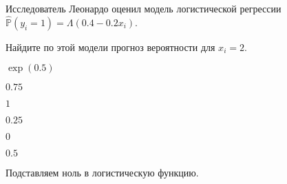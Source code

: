 
\begin{question}
Исследователь Леонардо оценил модель логистической регрессии
\(\hat{\mathbb{P}}(y_i = 1) = \Lambda(0.4 - 0.2 x_i)\).

Найдите по этой модели прогноз вероятности для \(x_i = 2\).
\begin{answerlist}
  \item \(\exp(0.5)\)
  \item \(0.75\)
  \item \(1\)
  \item \(0.25\)
  \item \(0\)
  \item \(0.5\)
\end{answerlist}
\end{question}

\begin{solution}
Подставляем ноль в логистическую функцию.
\end{solution}

